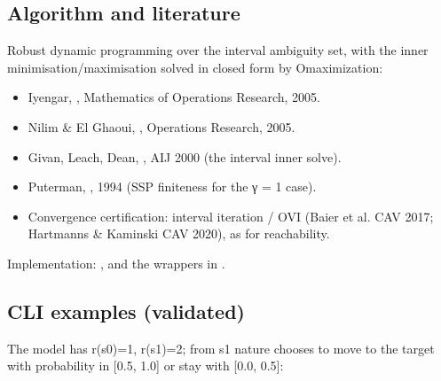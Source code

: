 \documentclass[a4paper,10pt,english]{sphinxmanual}
\begin{document}
\subsection{Algorithm and literature}
\label{\detokenize{manual/rewards:algorithm-and-literature}}
\sphinxAtStartPar
Robust dynamic programming over the interval ambiguity set, with the inner
minimisation/maximisation solved in closed form by O\sphinxhyphen{}maximization:
\begin{itemize}
\item {} 
\sphinxAtStartPar
Iyengar, , Mathematics of Operations Research, 2005.

\item {} 
\sphinxAtStartPar
Nilim \& El Ghaoui, ,
Operations Research, 2005.

\item {} 
\sphinxAtStartPar
Givan, Leach, Dean, , AIJ 2000 (the interval inner solve).

\item {} 
\sphinxAtStartPar
Puterman, , 1994 (SSP finiteness for the γ = 1 case).

\item {} 
\sphinxAtStartPar
Convergence certification: interval iteration / OVI (Baier et al. CAV 2017;
Hartmanns \& Kaminski CAV 2020), as for reachability.

\end{itemize}

\sphinxAtStartPar
Implementation: ,  and the
 wrappers in .


\subsection{CLI examples (validated)}
\label{\detokenize{manual/rewards:cli-examples-validated}}
\sphinxAtStartPar
The  model has r(s0)=1, r(s1)=2; from s1 nature chooses to move to the
target with probability in {[}0.5, 1.0{]} or stay with {[}0.0, 0.5{]}:
\end{document}
